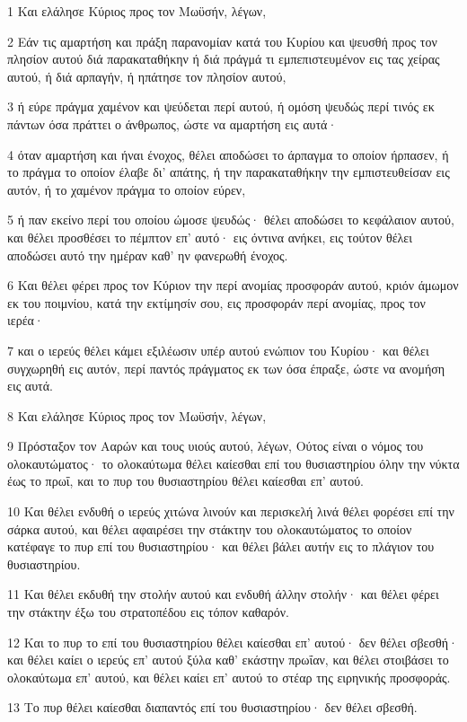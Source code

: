 \par 1 Και ελάλησε Κύριος προς τον Μωϋσήν, λέγων,
\par 2 Εάν τις αμαρτήση και πράξη παρανομίαν κατά του Κυρίου και ψευσθή προς τον πλησίον αυτού διά παρακαταθήκην ή διά πράγμά τι εμπεπιστευμένον εις τας χείρας αυτού, ή διά αρπαγήν, ή ηπάτησε τον πλησίον αυτού,
\par 3 ή εύρε πράγμα χαμένον και ψεύδεται περί αυτού, ή ομόση ψευδώς περί τινός εκ πάντων όσα πράττει ο άνθρωπος, ώστε να αμαρτήση εις αυτά·
\par 4 όταν αμαρτήση και ήναι ένοχος, θέλει αποδώσει το άρπαγμα το οποίον ήρπασεν, ή το πράγμα το οποίον έλαβε δι' απάτης, ή την παρακαταθήκην την εμπιστευθείσαν εις αυτόν, ή το χαμένον πράγμα το οποίον εύρεν,
\par 5 ή παν εκείνο περί του οποίου ώμοσε ψευδώς· θέλει αποδώσει το κεφάλαιον αυτού, και θέλει προσθέσει το πέμπτον επ' αυτό· εις όντινα ανήκει, εις τούτον θέλει αποδώσει αυτό την ημέραν καθ' ην φανερωθή ένοχος.
\par 6 Και θέλει φέρει προς τον Κύριον την περί ανομίας προσφοράν αυτού, κριόν άμωμον εκ του ποιμνίου, κατά την εκτίμησίν σου, εις προσφοράν περί ανομίας, προς τον ιερέα·
\par 7 και ο ιερεύς θέλει κάμει εξιλέωσιν υπέρ αυτού ενώπιον του Κυρίου· και θέλει συγχωρηθή εις αυτόν, περί παντός πράγματος εκ των όσα έπραξε, ώστε να ανομήση εις αυτά.
\par 8 Και ελάλησε Κύριος προς τον Μωϋσήν, λέγων,
\par 9 Πρόσταξον τον Ααρών και τους υιούς αυτού, λέγων, Ούτος είναι ο νόμος του ολοκαυτώματος· το ολοκαύτωμα θέλει καίεσθαι επί του θυσιαστηρίου όλην την νύκτα έως το πρωΐ, και το πυρ του θυσιαστηρίου θέλει καίεσθαι επ' αυτού.
\par 10 Και θέλει ενδυθή ο ιερεύς χιτώνα λινούν και περισκελή λινά θέλει φορέσει επί την σάρκα αυτού, και θέλει αφαιρέσει την στάκτην του ολοκαυτώματος το οποίον κατέφαγε το πυρ επί του θυσιαστηρίου· και θέλει βάλει αυτήν εις το πλάγιον του θυσιαστηρίου.
\par 11 Και θέλει εκδυθή την στολήν αυτού και ενδυθή άλλην στολήν· και θέλει φέρει την στάκτην έξω του στρατοπέδου εις τόπον καθαρόν.
\par 12 Και το πυρ το επί του θυσιαστηρίου θέλει καίεσθαι επ' αυτού· δεν θέλει σβεσθή· και θέλει καίει ο ιερεύς επ' αυτού ξύλα καθ' εκάστην πρωΐαν, και θέλει στοιβάσει το ολοκαύτωμα επ' αυτού, και θέλει καίει επ' αυτού το στέαρ της ειρηνικής προσφοράς.
\par 13 Το πυρ θέλει καίεσθαι διαπαντός επί του θυσιαστηρίου· δεν θέλει σβεσθή.
